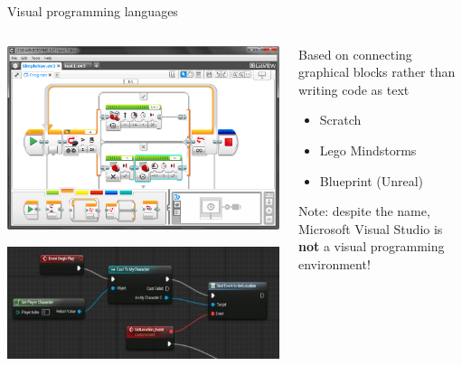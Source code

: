 \begin{frame}{Visual programming languages}
	\begin{columns}
		\begin{column}{0.4\textwidth}
			\includegraphics[width=\textwidth]{mindstorms}
			\par\vspace{2ex}\par
			\includegraphics[width=\textwidth]{blueprint}
		\end{column}
		\begin{column}{0.58\textwidth}
			\pause Based on connecting graphical blocks rather than writing code as text
			\begin{itemize}
				\pause\item Scratch
				\pause\item Lego Mindstorms
				\pause\item Blueprint (Unreal)
			\end{itemize}
			\pause Note: despite the name, Microsoft Visual Studio is \textbf{not}
				a visual programming environment!
		\end{column}
	\end{columns}
\end{frame}

